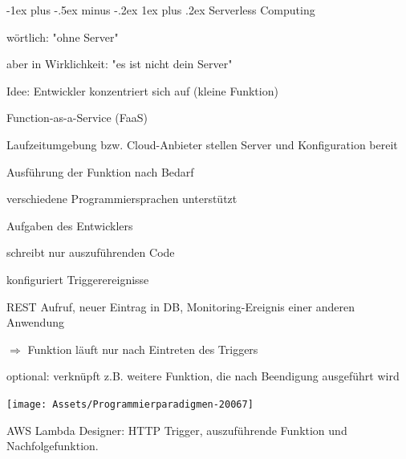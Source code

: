 \documentclass[10pt]{article}
\makeatletter
\renewcommand{\subsubsection}{\@startsection{subsubsection}{3}{0mm}%
                                {-1ex plus -.5ex minus -.2ex}%
                                {1ex plus .2ex}%
                                {\normalfont\small\bfseries}}
\makeatother
\begin{document}
\subsubsection{Serverless Computing}
\begin{itemize*}
  \item wörtlich: "ohne Server"
  \begin{itemize*}
    \item aber in Wirklichkeit: "es ist nicht dein Server"
    \item Idee: Entwickler konzentriert sich auf (kleine Funktion)
    \begin{itemize*}
      \item Function-as-a-Service (FaaS)
    \end{itemize*}
    \item Laufzeitumgebung bzw. Cloud-Anbieter stellen Server und Konfiguration bereit
    \item Ausführung der Funktion nach Bedarf
    \item verschiedene Programmiersprachen unterstützt
  \end{itemize*}
\end{itemize*}
Aufgaben des Entwicklers
\begin{itemize*}
  \item schreibt nur auszuführenden Code
  \item konfiguriert Triggerereignisse
  \begin{itemize*}
    \item REST Aufruf, neuer Eintrag in DB, Monitoring-Ereignis einer anderen Anwendung
    \item $\Rightarrow$ Funktion läuft nur nach Eintreten des Triggers
    \item optional: verknüpft z.B. weitere Funktion, die nach Beendigung ausgeführt wird
  \end{itemize*}
\end{itemize*}
\begin{center}
  \centering
  \texttt{[image: Assets/Programmierparadigmen-20067]}
\end{center}
AWS Lambda Designer: HTTP Trigger, auszuführende Funktion und Nachfolgefunktion.
\end{document}
